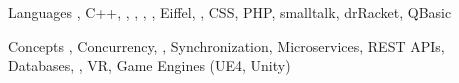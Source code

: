 

\begin{cvskills}

\cvskill
  {Languages} %
  {, C++, , , , , Eiffel, , CSS, PHP, smalltalk, drRacket, QBasic} %

\cvskill
  {Concepts} %
  {, Concurrency, , Synchronization, Microservices, REST APIs, Databases, , VR, Game Engines (UE4, Unity)} %

\end{cvskills}
